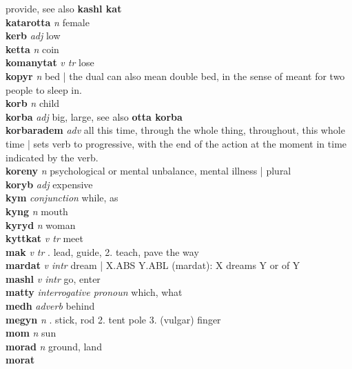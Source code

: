 provide, see also \textbf{kashl kat}\\\textbf{katarotta}   \emph{n} \textperiodcentered female\\\textbf{kerb}   \emph{adj} \textperiodcentered low\\\textbf{ketta}   \emph{n} \textperiodcentered coin\\\textbf{komanytat}   \emph{v tr} \textperiodcentered lose\\\textbf{kopyr}   \emph{n} \textperiodcentered bed | the dual can also mean double bed, in the sense of meant for two people to sleep in.\\\textbf{korb}   \emph{n} \textperiodcentered child\\\textbf{korba}   \emph{adj} \textperiodcentered big, large, see also \textbf{otta korba}\\\textbf{korbaradem}   \emph{adv} \textperiodcentered all this time, through the whole thing, throughout, this whole time | sets verb to progressive, with the end of the action at the moment in time indicated by the verb.\\\textbf{koreny}   \emph{n} \textperiodcentered psychological or mental unbalance, mental illness | plural\\\textbf{koryb}   \emph{adj} \textperiodcentered expensive\\\textbf{kym}   \emph{conjunction} \textperiodcentered while, as\\\textbf{kyng}   \emph{n} \textperiodcentered mouth\\\textbf{kyryd}   \emph{n} \textperiodcentered woman\\\textbf{kyttkat}   \emph{v tr} \textperiodcentered meet\\\textbf{mak}   \emph{v tr} . lead, guide, 2. teach, pave the way \\\textbf{mardat}   \emph{v intr} \textperiodcentered dream | X.ABS Y.ABL (mardat): X dreams Y or of Y\\\textbf{mashl}   \emph{v intr} \textperiodcentered go, enter\\\textbf{matty}   \emph{interrogative pronoun} \textperiodcentered which, what\\\textbf{medh}   \emph{adverb} \textperiodcentered behind\\\textbf{megyn}   \emph{n} . stick, rod 2. tent pole 3. (vulgar) finger \\\textbf{mom}   \emph{n} \textperiodcentered sun\\\textbf{morad}   \emph{n} \textperiodcentered ground, land\\\textbf{morat}   
